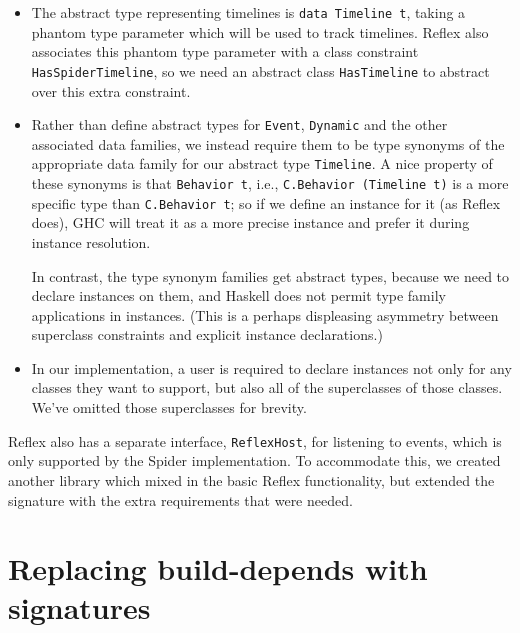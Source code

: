 \begin{itemize}
    \item The abstract type representing timelines is
        \verb|data Timeline t|, taking a phantom type parameter
        which will be used to track timelines.
        Reflex also associates this phantom type parameter with
        a class constraint \verb|HasSpiderTimeline|, so we need
        an abstract class \verb|HasTimeline| to abstract over
        this extra constraint.

    \item Rather than define abstract types for \verb|Event|,
        \verb|Dynamic| and the other associated data families,
        we instead require them to be type synonyms of the
        appropriate data family for our abstract type \verb|Timeline|.
        A nice property of these synonyms is that
        \verb|Behavior t|, i.e., \verb|C.Behavior (Timeline t)|
        is a more specific type than \verb|C.Behavior t|; so if
        we define an instance for it (as Reflex does),
        GHC will treat it as a more precise instance and prefer
        it during instance resolution.


        In contrast, the type synonym families get abstract
        types, because we need to declare instances on them,
        and Haskell does not permit type family applications in
        instances. (This is a perhaps displeasing asymmetry between
        superclass constraints and explicit instance declarations.)

    \item In our implementation, a user is required to declare
        instances not only for any classes they want to support,
        but also all of the superclasses of those classes.  We've
        omitted those superclasses for brevity.
\end{itemize}
%
Reflex also has a separate interface, \verb|ReflexHost|, for listening
to events, which is only supported by the Spider implementation.
To accommodate this, we created another library which mixed in
the basic Reflex functionality, but extended the signature with the
extra requirements that were needed.

\section{Replacing build-depends with signatures}

